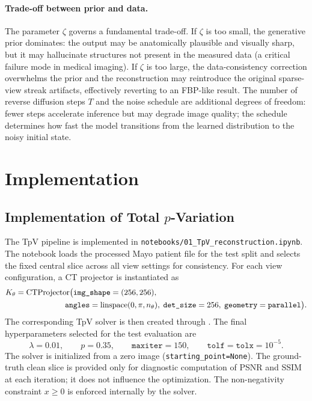 \documentclass[11pt,a4paper]{article}
\begin{document}
\paragraph{Trade-off between prior and data.}
The parameter $\zeta$ governs a fundamental trade-off. If $\zeta$ is too small,
the generative prior dominates: the output may be anatomically plausible and
visually sharp, but it may hallucinate structures not present in the measured
data (a critical failure mode in medical imaging). If $\zeta$ is too large, the
data-consistency correction overwhelms the prior and the reconstruction may
reintroduce the original sparse-view streak artifacts, effectively reverting to
an FBP-like result. The number of reverse diffusion steps $T$ and the noise
schedule are additional degrees of freedom: fewer steps accelerate inference
but may degrade image quality; the schedule determines how fast the model
transitions from the learned distribution to the noisy initial state.

\section{Implementation}

\subsection{Implementation of Total \texorpdfstring{$p$}{p}-Variation}

The TpV pipeline is implemented in
\texttt{notebooks/01\_TpV\_reconstruction.ipynb}. The notebook loads the
processed Mayo patient file for the test split and selects the fixed central
slice across all view settings for consistency. For each view configuration, a
CT projector is instantiated as
\begin{equation}
  \begin{aligned}
  K_\theta
  &=
  \operatorname{CTProjector}
  \bigl(
  \texttt{img\_shape}=(256,256),\\
  &\hspace{2.2cm}
  \texttt{angles}=\operatorname{linspace}(0,\pi,n_\theta),\;
  \texttt{det\_size}=256,\;
  \texttt{geometry}=\texttt{parallel}
  \bigr).
  \end{aligned}
  \label{eq:ippy-projector}
\end{equation}
The corresponding TpV solver is then created through
. The
final hyperparameters selected for the test evaluation are
\begin{equation}
  \lambda = 0.01,
  \qquad
  p = 0.35,
  \qquad
  \texttt{maxiter}=150,
  \qquad
  \texttt{tolf}=\texttt{tolx}=10^{-5}.
  \label{eq:tpv-parameters}
\end{equation}
The solver is initialized from a zero image (\texttt{starting\_point=None}).
The ground-truth clean slice is provided only for diagnostic computation of
PSNR and SSIM at each iteration; it does not influence the optimization. The
non-negativity constraint $x \ge 0$ is enforced internally by the solver.
\end{document}
